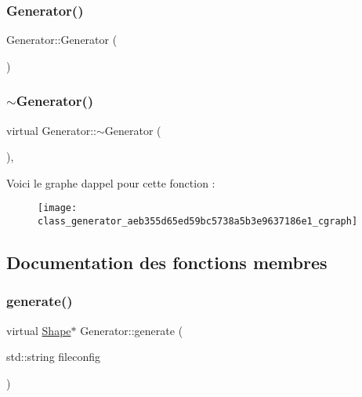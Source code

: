\subsubsection{\texorpdfstring{Generator()}{Generator()}}
{\footnotesize\ttfamily Generator\+::\+Generator (\begin{DoxyParamCaption}{ }\end{DoxyParamCaption})\hspace{0.3cm}{\ttfamily [inline]}}

\mbox{\label{class_generator_aeb355d65ed59bc5738a5b3e9637186e1}} 
\subsubsection{\texorpdfstring{$\sim$\+Generator()}{~Generator()}}
{\footnotesize\ttfamily virtual Generator\+::$\sim$\+Generator (\begin{DoxyParamCaption}{ }\end{DoxyParamCaption})\hspace{0.3cm}{\ttfamily [inline]}, {\ttfamily [virtual]}}

Voici le graphe d\textquotesingle{}appel pour cette fonction \+:\nopagebreak
\begin{figure}[H]
\begin{center}
\leavevmode
\texttt{[image: class\_generator\_aeb355d65ed59bc5738a5b3e9637186e1\_cgraph]}
\end{center}
\end{figure}


\subsection{Documentation des fonctions membres}
\mbox{\label{class_generator_a91197ce0544ad549cf3646957c33c0e9}} 
\subsubsection{\texorpdfstring{generate()}{generate()}}
{\footnotesize\ttfamily virtual \hyperlink{class_shape}{Shape}$\ast$ Generator\+::generate (\begin{DoxyParamCaption}\item[{std\+::string}]{fileconfig }\end{DoxyParamCaption})\hspace{0.3cm}{\ttfamily [pure virtual]}}



